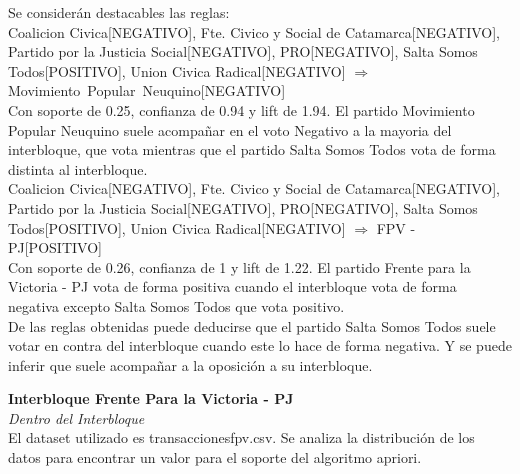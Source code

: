 \documentclass{endm}
\begin{document}
Se considerán destacables las reglas: \\

{Coalicion Civica[NEGATIVO], Fte. Civico y Social de Catamarca[NEGATIVO], Partido por la Justicia Social[NEGATIVO], PRO[NEGATIVO], Salta Somos Todos[POSITIVO], Union Civica Radical[NEGATIVO]} $\Longrightarrow$ \\ {Movimiento\ Popular\ Neuquino[NEGATIVO]} \\

Con soporte de 0.25, confianza de 0.94 y lift de 1.94. El partido Movimiento Popular Neuquino suele acompañar en el voto Negativo a la mayoria del interbloque, que vota mientras que el partido Salta Somos Todos vota de forma distinta al interbloque. \\

{Coalicion Civica[NEGATIVO],
Fte. Civico y Social de Catamarca[NEGATIVO],    
Partido por la Justicia Social[NEGATIVO],       
PRO[NEGATIVO], 
Salta Somos Todos[POSITIVO], Union Civica Radical[NEGATIVO]} $\Longrightarrow$ {FPV - PJ[POSITIVO]} \\

Con soporte de 0.26, confianza de 1 y lift de 1.22. El partido Frente para la Victoria - PJ vota de forma positiva cuando el interbloque vota de forma negativa excepto Salta Somos Todos que vota positivo.\\

De las reglas obtenidas puede deducirse que el partido Salta Somos Todos suele votar en contra del interbloque cuando este lo hace de forma negativa. Y se puede inferir que suele acompañar a la oposición a su interbloque.  \\

\newpage 

\textbf{Interbloque Frente Para la Victoria - PJ}\\

\textit{Dentro del Interbloque} \\

El dataset utilizado es transaccionesfpv.csv. Se analiza la distribución de los datos para encontrar un valor para el soporte del algoritmo apriori. \\
\end{document}
